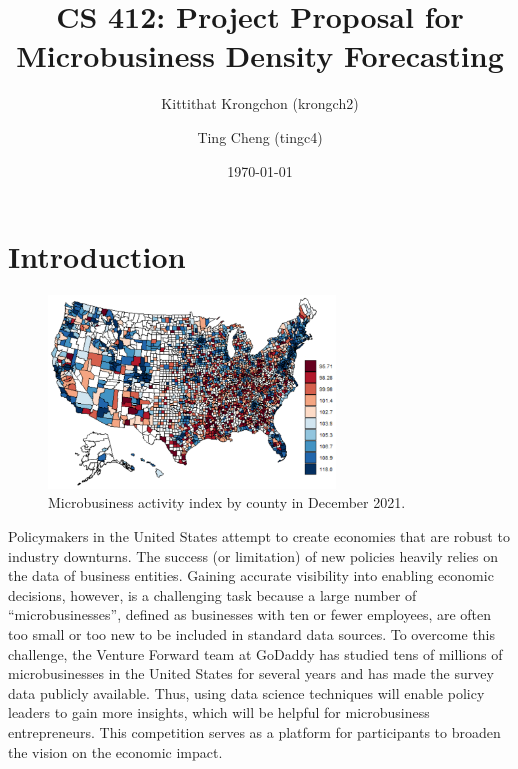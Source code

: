 \documentclass[prl,aps,superscriptaddress,twocolumn,10pt,nolongbibliography]{revtex4-2}
\begin{document}
\title{CS 412: Project Proposal for Microbusiness Density Forecasting}
\author{Kittithat Krongchon (krongch2)}
\author{Ting Cheng (tingc4)}
\date{\today}

\maketitle

\section{Introduction}
\begin{figure}
\includegraphics[width=3in]{figs/activity.png}
\caption{\label{fig:activity}
Microbusiness activity index by county in December 2021.
}
\end{figure}

Policymakers in the United States attempt to create economies that are robust to industry downturns. 
The success (or limitation) of new policies heavily relies on the data of business entities. 
Gaining accurate visibility into enabling economic decisions, however, is a challenging task because a large number of ``microbusinesses'', defined as businesses with ten or fewer employees, are often too small or too new to be included in standard data sources.
To overcome this challenge, the Venture Forward team at GoDaddy has studied tens of millions of microbusinesses in the United States for several years and has made the survey data publicly available. 
Thus, using data science techniques will enable policy leaders to gain more insights, which will be helpful for microbusiness entrepreneurs. 
This competition serves as a platform for participants to broaden the vision on the economic impact. 
\end{document}
